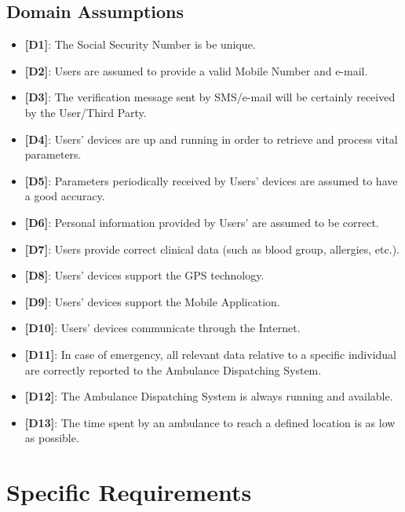 \documentclass[12pt,a4paper]{article}
\begin{document}
		\subsection{Domain Assumptions}
			\begin{itemize}
				\item {\textbf[}\textbf{D1}{\textbf]}: The Social Security Number is be unique.
				\item {\textbf[}\textbf{D2}{\textbf]}: Users are assumed to provide a valid Mobile Number and e-mail.
				\item {\textbf[}\textbf{D3}{\textbf]}: The verification message sent by SMS/e-mail will be certainly received by the User/Third Party.
				\item {\textbf[}\textbf{D4}{\textbf]}: Users' devices are up and running in order to retrieve and process vital parameters.
				\item {\textbf[}\textbf{D5}{\textbf]}: Parameters periodically received by Users' devices are assumed to have a good accuracy.
				\item {\textbf[}\textbf{D6}{\textbf]}: Personal information provided by Users' are assumed to be correct.
				\item {\textbf[}\textbf{D7}{\textbf]}: Users provide correct clinical data (such as blood group, allergies, etc.).
				\item {\textbf[}\textbf{D8}{\textbf]}: Users' devices support the GPS technology.
				\item {\textbf[}\textbf{D9}{\textbf]}: Users' devices support the Mobile Application.
				\item {\textbf[}\textbf{D10}{\textbf]}: Users' devices communicate through the Internet.
				\item {\textbf[}\textbf{D11}{\textbf]}: In case of emergency, all relevant data relative to a specific individual are correctly reported to the Ambulance Dispatching System.
				\item {\textbf[}\textbf{D12}{\textbf]}: The Ambulance Dispatching System is always running and available.
				\item {\textbf[}\textbf{D13}{\textbf]}: The time spent by an ambulance to reach a defined location is as low as possible.
			\end{itemize}

	\newpage
	\section{Specific Requirements}
\end{document}
